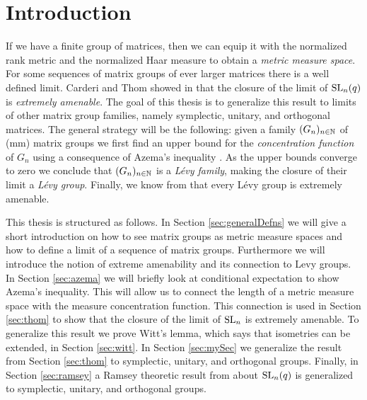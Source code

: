 
\section{Introduction}
If we have a finite group of matrices, then we can equip it with the normalized rank metric and the normalized Haar measure to obtain a \emph{metric measure space}.
For some sequences of matrix groups of ever larger matrices there is a well defined limit.
Carderi and Thom  showed in \cite{thom} that the closure of the limit of $\operatorname{SL}_n(q)$ is \emph{extremely amenable}. The goal of this thesis is to generalize this result to limits of other matrix group families, namely symplectic, unitary, and orthogonal matrices. The general strategy will be the following: given a family $(G_n)_{n\in\mathbb{N}}$ of (mm) matrix groups we first find an upper bound for the \emph{concentration function} of $G_n$ using a consequence of Azema's inequality \cite{Azema book}. As the upper bounds converge to zero we conclude that $(G_n)_{n\in\mathbb{N}}$ is a \emph{L\'{e}vy family}, making the closure of their limit a \emph{L\'{e}vy group}. Finally, we know from \cite{29} that every L\'{e}vy group is extremely amenable.

This thesis is structured as follows. In Section \ref{sec:generalDefns} we will give a short introduction on how to see matrix groups as metric measure spaces and how to define a limit of a sequence of matrix groups. Furthermore we will introduce the notion of extreme amenability and its connection to Levy groups. In Section \ref{sec:azema} we will briefly look at conditional expectation to show Azema's inequality. This will allow us to connect the length of a metric measure space with the measure concentration function. This connection is used in Section \ref{sec:thom} to show that the closure of the limit of $\operatorname{SL}_n$ is extremely amenable. To generalize this result we prove Witt's lemma, which says that isometries can be extended, in Section \ref{sec:witt}. In Section \ref{sec:mySec} we generalize the result from Section \ref{sec:thom} to symplectic, unitary, and orthogonal groups. Finally, in Section \ref{sec:ramsey} a Ramsey theoretic result from \cite{thom} about $\operatorname{SL}_n(q)$ is generalized to symplectic, unitary, and orthogonal groups.



